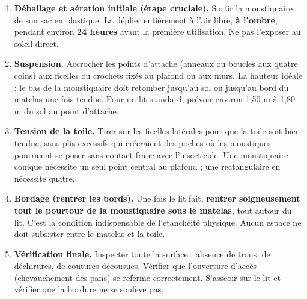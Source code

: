 \documentclass[11pt]{article}
\begin{document}
\begin{methode}
\begin{enumerate}
    \item \textbf{Déballage et aération initiale (étape cruciale).} Sortir la moustiquaire de son sac en plastique. La déplier entièrement à l'air libre, \textbf{à l'ombre}, pendant environ \textbf{24 heures} avant la première utilisation. Ne pas l'exposer au soleil direct.
    \item \textbf{Suspension.} Accrocher les points d'attache (anneaux ou boucles aux quatre coins) aux ficelles ou crochets fixés au plafond ou aux murs. La hauteur idéale : le bas de la moustiquaire doit retomber jusqu'au sol ou jusqu'au bord du matelas une fois tendue. Pour un lit standard, prévoir environ 1,50 m à 1,80 m du sol au point d'attache.
    \item \textbf{Tension de la toile.} Tirer sur les ficelles latérales pour que la toile soit bien tendue, sans plis excessifs qui créeraient des poches où les moustiques pourraient se poser sans contact franc avec l'insecticide. Une moustiquaire conique nécessite un seul point central au plafond ; une rectangulaire en nécessite quatre.
    \item \textbf{Bordage (rentrer les bords).} Une fois le lit fait, \textbf{rentrer soigneusement tout le pourtour de la moustiquaire sous le matelas}, tout autour du lit. C'est la condition indispensable de l'étanchéité physique. Aucun espace ne doit subsister entre le matelas et la toile.
    \item \textbf{Vérification finale.} Inspecter toute la surface : absence de trous, de déchirures, de coutures décousues. Vérifier que l'ouverture d'accès (chevauchement des pans) se referme correctement. S'asseoir sur le lit et vérifier que la bordure ne se soulève pas.
\end{enumerate}
\end{methode}
\end{document}
